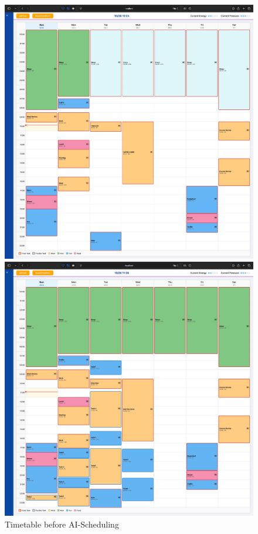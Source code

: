 \documentclass[12pt, a4paper]{article}
\begin{document}
\begin{enumerate}
                    \begin{figure}[H]
                        \begin{minipage}[t]{0.49\textwidth}
                            \centering
                            \includegraphics[width=\textwidth]{Images/System/ai_scheduling/bf_scheduling.JPG}
                            \caption{Timetable before AI-Scheduling}
                            \label{bf_scheduling}
                        \end{minipage}
                        \hfill
                        \begin{minipage}[t]{0.49\textwidth}
                            \centering
                            \includegraphics[width=\textwidth]{Images/System/ai_scheduling/aft_scheduling.jpeg}

\end{minipage}
\end{figure}
\end{enumerate}
\end{document}
